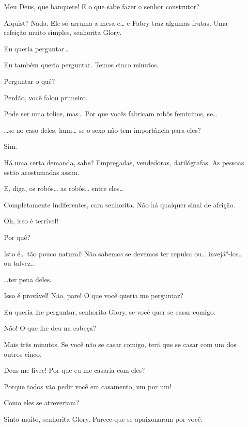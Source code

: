  Meu Deus, que banquete! E o que sabe fazer o senhor construtor?

 Alquist? Nada. Ele só arruma a mesa e\ldots{} e Fabry traz algumas frutas. Uma
refeição muito simples, senhorita Glory.

 Eu queria perguntar\ldots{}

 Eu também queria perguntar.  Temos
cinco minutos.

 Perguntar o quê?

 Perdão, você falou primeiro.

 Pode ser uma tolice, mas\ldots{} Por que vocês fabricam robôs femininos, se\ldots{}

 \ldots{}se no caso deles, hum\ldots{} se o sexo não tem importância para eles?

 Sim.

 Há uma certa demanda, sabe? Empregadas, vendedoras, datilógrafas. As
pessoas estão acostumadas assim.

 E, diga, os robôs\ldots{} as robôs\ldots{} entre eles\ldots{} 

 Completamente indiferentes, cara senhorita. Não há qualquer sinal de
afeição.

 Oh, isso é terrível!

 Por quê?

 Isto é\ldots{} tão pouco natural! Não sabemos se devemos ter repulsa ou\ldots{} invejá"-los\ldots{} ou talvez\ldots{}

 \ldots{}ter pena deles.

 Isso é provável! Não, pare! O que você queria me perguntar?

 Eu queria lhe perguntar, senhorita Glory, se você quer se casar comigo.

 Não! O que lhe deu na cabeça?

  Mais três minutos. Se você não se casar
comigo, terá que se casar com um dos outros cinco.

 Deus me livre! Por que eu me casaria com eles?

 Porque todos vão pedir você em casamento, um por um!

 Como eles se atreveriam?

 Sinto muito, senhorita Glory. Parece que se apaixonaram por você.

